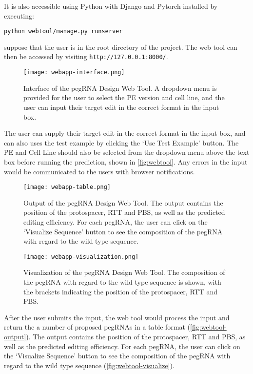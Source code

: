 It is also accessible using Python with Django and Pytorch installed by executing:

\verb|python webtool/manage.py runserver|

suppose that the user is in the root directory of the project. The web tool can then be accessed by visiting \verb|http://127.0.0.1:8000/|.

\begin{figure}
    \centering
    \texttt{[image: webapp-interface.png]}
    \caption[pegRNA Design Web Tool Interface]{Interface of the pegRNA Design Web Tool. A dropdown menu is provided for the user to select the PE version and cell line, and the user can input their target edit in the correct format in the input box.}
    \label{fig:webtool}
\end{figure}

The user can supply their target edit in the correct format in the input box, and can also uses the test example by clicking the `Use Test Example' button. The PE and Cell Line should also be selected from the dropdown menu above the text box before running the prediction, shown in \autoref{fig:webtool}. Any errors in the input would be communicated to the users with browser notifications. 

\begin{figure}
    \centering
    \texttt{[image: webapp-table.png]}
    \caption[pegRNA Design Web Tool Output]{Output of the pegRNA Design Web Tool. The output contains the position of the protospacer, RTT and PBS, as well as the predicted editing efficiency. For each pegRNA, the user can click on the `Visualize Sequence' button to see the composition of the pegRNA with regard to the wild type sequence.}
    \label{fig:webtool-output}
\end{figure}

\begin{figure}
    \centering
    \texttt{[image: webapp-visualization.png]}
    \caption[pegRNA Design Web Tool Visualization]{Visualization of the pegRNA Design Web Tool. The composition of the pegRNA with regard to the wild type sequence is shown, with the brackets indicating the position of the protospacer, RTT and PBS.}
    \label{fig:webtool-visualize}
\end{figure}


After the user submits the input, the web tool would process the input and return the a number of proposed pegRNAs in a table format (\autoref{fig:webtool-output}). The output contains the position of the protospacer, RTT and PBS, as well as the predicted editing efficiency. For each pegRNA, the user can click on the `Visualize Sequence' button to see the composition of the pegRNA with regard to the wild type sequence (\autoref{fig:webtool-visualize}).